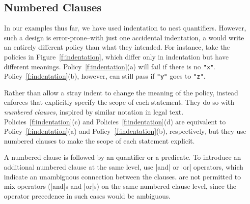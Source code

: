 \subsection{Numbered Clauses} 

In our examples thus far, we have used indentation to nest quantifiers.
%
However, such a design is error-prone--with just one accidental indentation, 
a \ce{} would write an entirely different policy than what they intended.
%
For instance, take the policies in Figure~\ref{f:indentation}, which differ only in indentation but have different meanings.
%
Policy~\ref{f:indentation}(a) will fail if there is no \lstinline[language=CNL]|"x"|.
%
Policy~\ref{f:indentation}(b), however, can still pass if \lstinline[language=CNL]|"y"| goes to \lstinline[language=CNL]|"z"|.

Rather than allow a stray indent to change the meaning of the policy,
\syslang{} instead enforces that \ces{} explicitly specify the scope of each statement.
%
They do so with \emph{numbered clauses}, inspired by similar notation in legal text.
%
Policies~\ref{f:indentation}(c) and Policies~\ref{f:indentation}(d) 
are equivalent to Policy~\ref{f:indentation}(a) and Policy~\ref{f:indentation}(b),
respectively, but they use \syslang{} numbered clauses to make the scope of each statement explicit.

A numbered clause is followed by an quantifier or a predicate.
%
To introduce an additional numbered clause at the same level, 
\ces{} use |and| or |or| operators,
which indicate an unambiguous connection between the clauses.
%
\Ces{} are not permitted to mix operators (|and|s and |or|s) on the same numbered clause level,
since the operator precedence in such cases would be ambiguous.

